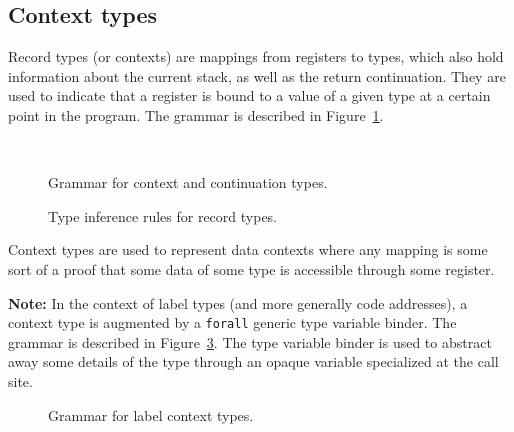 \subsection{Context types}\label{subsec:nstar-common-ts-records}

Record types (or contexts) are mappings from registers to types, which also hold information about the current stack, as well as the return continuation.
They are used to indicate that a register is bound to a value of a given type at a certain point in the program.
The grammar is described in Figure~\ref{fig:nstar-common-ts-records-syntax}.

\begin{figure}[htb]
  \centering
  \\
  \caption{Grammar for context and continuation types.}
  \label{fig:nstar-common-ts-records-syntax}
\end{figure}

\begin{figure}[htb]
  \centering

  \begin{prooftree}
  \end{prooftree}

  \caption{Type inference rules for record types.}
  \label{fig:nstar-common-ts-records-typerules}
\end{figure}

Context types are used to represent data contexts where any mapping is some sort of a proof that some data of some type is accessible through some register.

\vspace{\baselineskip}

\textbf{Note:} In the context of label types (and more generally code addresses), a context type is augmented by a \texttt{forall} generic type variable binder.
The grammar is described in Figure~\ref{fig:nstar-common-ts-label-types-syntax}.
The type variable binder is used to abstract away some details of the type through an opaque variable specialized at the call site.

\begin{figure}[htb]
  \centering
  \caption{Grammar for label context types.}
  \label{fig:nstar-common-ts-label-types-syntax}
\end{figure}

